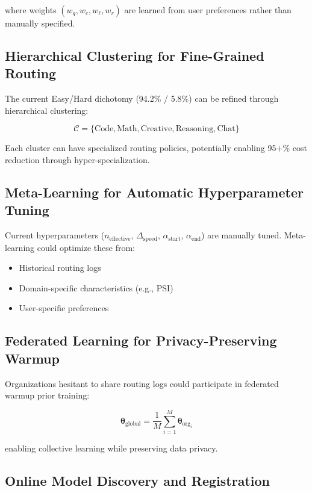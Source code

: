 \documentclass[sigconf]{acmart}
\begin{document}
where weights $(w_q, w_c, w_\ell, w_r)$ are learned from user preferences rather than manually specified.

\subsection{Hierarchical Clustering for Fine-Grained Routing}

The current Easy/Hard dichotomy (94.2\% / 5.8\%) can be refined through hierarchical clustering:

\begin{equation}
\mathcal{C} = \{\text{Code}, \text{Math}, \text{Creative}, \text{Reasoning}, \text{Chat}\}
\end{equation}

Each cluster can have specialized routing policies, potentially enabling 95$+$\% cost reduction through hyper-specialization.

\subsection{Meta-Learning for Automatic Hyperparameter Tuning}

Current hyperparameters ($n_{\text{effective}}$, $\Delta_{\text{speed}}$, $\alpha_{\text{start}}$, $\alpha_{\text{end}}$) are manually tuned. Meta-learning could optimize these from:

\begin{itemize}
    \item Historical routing logs
    \item Domain-specific characteristics (e.g., PSI)
    \item User-specific preferences
\end{itemize}

\subsection{Federated Learning for Privacy-Preserving Warmup}

Organizations hesitant to share routing logs could participate in federated warmup prior training:

\begin{equation}
\boldsymbol{\theta}_{\text{global}} = \frac{1}{M} \sum_{i=1}^M \boldsymbol{\theta}_{\text{org}_i}
\end{equation}

enabling collective learning while preserving data privacy.

\subsection{Online Model Discovery and Registration}
\end{document}
